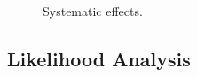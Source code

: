 \documentclass[iop]{emulateapj}
\begin{document}





\begin{figure}
   \caption{\label{fig_sys}
  Systematic effects.
   }
\end{figure}


\subsection{Likelihood Analysis}
\end{document}
